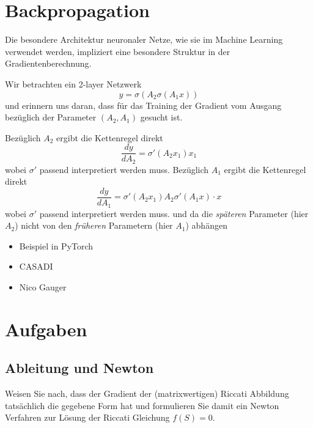 \documentclass[
]{book}
\providecommand{\tightlist}{%
  \setlength{\itemsep}{0pt}\setlength{\parskip}{0pt}}
\theoremstyle{definition}
\theoremstyle{definition}
\theoremstyle{definition}
\theoremstyle{definition}
\theoremstyle{remark}
\begin{document}
\hypertarget{backpropagation}{%
\section{Backpropagation}\label{backpropagation}}

Die besondere Architektur neuronaler Netze, wie sie im Machine Learning
verwendet werden, impliziert eine besondere Struktur in der
Gradientenberechnung.

Wir betrachten ein 2-layer Netzwerk
\begin{equation*}
y = \sigma(A_2 \sigma(A_1x))
\end{equation*}
und erinnern uns daran, dass für das Training der Gradient vom Ausgang
bezüglich der Parameter \((A_2, A_1)\) gesucht ist.

Bezüglich \(A_2\) ergibt die Kettenregel direkt
\begin{equation*}
\frac{dy}{dA_2} = \sigma'(A_2x_1)x_1
\end{equation*}
wobei \(\sigma'\) passend interpretiert werden muss.
Bezüglich \(A_1\) ergibt die Kettenregel direkt
\begin{equation*}
\frac{dy}{dA_1} = \sigma'(A_2x_1)A_2\sigma'(A_1x)\cdot x
\end{equation*}
wobei \(\sigma'\) passend interpretiert werden muss.
und da die \emph{späteren} Parameter (hier \(A_2\)) nicht von den \emph{früheren}
Parametern (hier \(A_1\)) abhängen

\begin{itemize}
\tightlist
\item
  Beispiel in PyTorch
\item
  CASADI
\item
  Nico Gauger
\end{itemize}

\hypertarget{aufgaben-3}{%
\section{Aufgaben}\label{aufgaben-3}}

\hypertarget{ableitung-und-newton}{%
\subsection{Ableitung und Newton}\label{ableitung-und-newton}}

Weisen Sie nach, dass der Gradient der (matrixwertigen) Riccati Abbildung
tatsächlich die gegebene Form hat und formulieren Sie damit ein Newton
Verfahren zur Lösung der Riccati Gleichung \(f(S)=0\).
\end{document}
